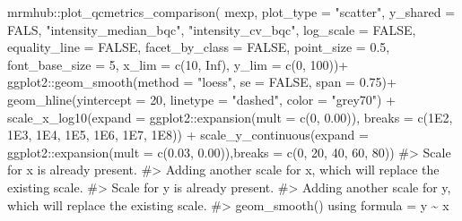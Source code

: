 \documentclass[
  letterpaper,
  DIV=11,
  numbers=noendperiod]{scrartcl}
\newenvironment{Shaded}{\begin{snugshade}}{\end{snugshade}}
\newcommand{\AttributeTok}[1]{\textcolor[rgb]{0.40,0.45,0.13}{#1}}
\newcommand{\CommentTok}[1]{\textcolor[rgb]{0.37,0.37,0.37}{#1}}
\newcommand{\ConstantTok}[1]{\textcolor[rgb]{0.56,0.35,0.01}{#1}}
\newcommand{\DecValTok}[1]{\textcolor[rgb]{0.68,0.00,0.00}{#1}}
\newcommand{\FloatTok}[1]{\textcolor[rgb]{0.68,0.00,0.00}{#1}}
\newcommand{\FunctionTok}[1]{\textcolor[rgb]{0.28,0.35,0.67}{#1}}
\newcommand{\NormalTok}[1]{\textcolor[rgb]{0.00,0.23,0.31}{#1}}
\newcommand{\SpecialCharTok}[1]{\textcolor[rgb]{0.37,0.37,0.37}{#1}}
\newcommand{\StringTok}[1]{\textcolor[rgb]{0.13,0.47,0.30}{#1}}
\begin{document}
\begin{Shaded}
\begin{Highlighting}[]
\NormalTok{mrmhub}\SpecialCharTok{::}\FunctionTok{plot\_qcmetrics\_comparison}\NormalTok{(}
\NormalTok{  mexp,}
  \AttributeTok{plot\_type =} \StringTok{"scatter"}\NormalTok{,}
  \AttributeTok{y\_shared =}\NormalTok{ FALS,}
  \StringTok{"intensity\_median\_bqc"}\NormalTok{,}
  \StringTok{"intensity\_cv\_bqc"}\NormalTok{, }
  \AttributeTok{log\_scale =} \ConstantTok{FALSE}\NormalTok{,}
  \AttributeTok{equality\_line =} \ConstantTok{FALSE}\NormalTok{,}
  \AttributeTok{facet\_by\_class =} \ConstantTok{FALSE}\NormalTok{,}
  \AttributeTok{point\_size =} \FloatTok{0.5}\NormalTok{,}
  \AttributeTok{font\_base\_size =} \DecValTok{5}\NormalTok{,}
  \AttributeTok{x\_lim =} \FunctionTok{c}\NormalTok{(}\DecValTok{10}\NormalTok{, }\ConstantTok{Inf}\NormalTok{),}
  \AttributeTok{y\_lim =} \FunctionTok{c}\NormalTok{(}\DecValTok{0}\NormalTok{, }\DecValTok{100}\NormalTok{))}\SpecialCharTok{+} 
\NormalTok{ggplot2}\SpecialCharTok{::}\FunctionTok{geom\_smooth}\NormalTok{(}\AttributeTok{method =} \StringTok{"loess"}\NormalTok{, }\AttributeTok{se =} \ConstantTok{FALSE}\NormalTok{, }\AttributeTok{span =} \FloatTok{0.75}\NormalTok{)}\SpecialCharTok{+}
\FunctionTok{geom\_hline}\NormalTok{(}\AttributeTok{yintercept =} \DecValTok{20}\NormalTok{, }\AttributeTok{linetype =} \StringTok{"dashed"}\NormalTok{, }\AttributeTok{color =} \StringTok{"grey70"}\NormalTok{) }\SpecialCharTok{+}
\FunctionTok{scale\_x\_log10}\NormalTok{(}\AttributeTok{expand =}\NormalTok{ ggplot2}\SpecialCharTok{::}\FunctionTok{expansion}\NormalTok{(}\AttributeTok{mult =} \FunctionTok{c}\NormalTok{(}\DecValTok{0}\NormalTok{, }\FloatTok{0.00}\NormalTok{)),}
             \AttributeTok{breaks =} \FunctionTok{c}\NormalTok{(}\FloatTok{1E2}\NormalTok{, }\FloatTok{1E3}\NormalTok{, }\FloatTok{1E4}\NormalTok{, }\FloatTok{1E5}\NormalTok{, }\FloatTok{1E6}\NormalTok{, }\FloatTok{1E7}\NormalTok{, }\FloatTok{1E8}\NormalTok{)) }\SpecialCharTok{+}
\FunctionTok{scale\_y\_continuous}\NormalTok{(}\AttributeTok{expand =}\NormalTok{ ggplot2}\SpecialCharTok{::}\FunctionTok{expansion}\NormalTok{(}\AttributeTok{mult =} \FunctionTok{c}\NormalTok{(}\FloatTok{0.03}\NormalTok{, }\FloatTok{0.00}\NormalTok{)),}\AttributeTok{breaks =} \FunctionTok{c}\NormalTok{(}\DecValTok{0}\NormalTok{, }\DecValTok{20}\NormalTok{, }\DecValTok{40}\NormalTok{, }\DecValTok{60}\NormalTok{, }\DecValTok{80}\NormalTok{))}
\CommentTok{\#\textgreater{} Scale for x is already present.}
\CommentTok{\#\textgreater{} Adding another scale for x, which will replace the existing scale.}
\CommentTok{\#\textgreater{} Scale for y is already present.}
\CommentTok{\#\textgreater{} Adding another scale for y, which will replace the existing scale.}
\CommentTok{\#\textgreater{} \textasciigrave{}geom\_smooth()\textasciigrave{} using formula = \textquotesingle{}y \textasciitilde{} x\textquotesingle{}}
\end{Highlighting}
\end{Shaded}
\end{document}
